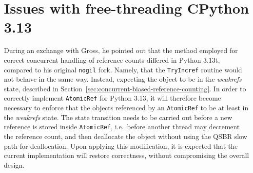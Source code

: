 \section{Issues with free-threading CPython 3.13}\label{sec:issues-with-free-threading-changes-and-proposed-re-implementation}

During an exchange with Gross, he pointed out that the method employed for correct concurrent handling of reference counts differed in Python 3.13t, compared to his original \texttt{nogil} fork.
Namely, that the \texttt{TryIncref} routine would not behave in the same way.
Instead, expecting the object to be in the \emph{weakrefs} state, described in Section~\ref{sec:concurrent-biased-reference-counting}.
In order to correctly implement \texttt{AtomicRef} for Python 3.13, it will therefore become necessary to enforce that the objects referenced by an \texttt{AtomicRef} to be at least in the \emph{weakrefs} state.
The state transition needs to be carried out before a new reference is stored inside \texttt{AtomicRef}, i.e.\ before another thread may decrement the reference count, and then deallocate the object without using the QSBR slow path for deallocation.
Upon applying this modification, it is expected that the current implementation will restore correctness, without compromising the overall design.
